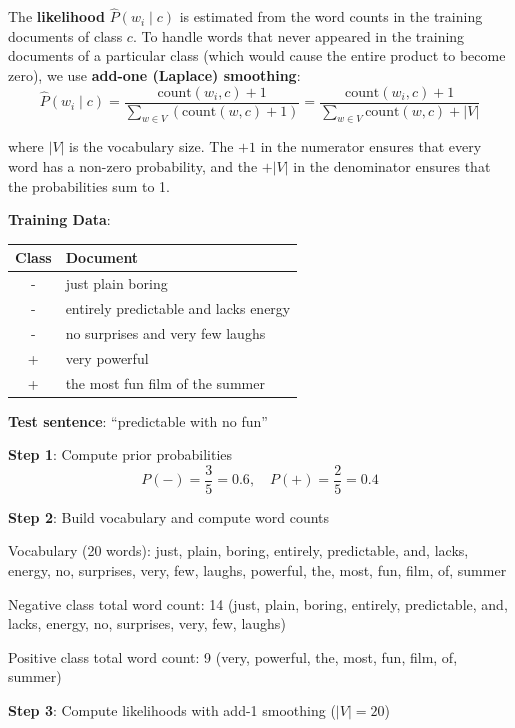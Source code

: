 \documentclass[11pt,a4paper]{article}
\begin{document}
The \textbf{likelihood} $\hat{P}(w_i \mid c)$ is estimated from the word counts in the training documents of class $c$. To handle words that never appeared in the training documents of a particular class (which would cause the entire product to become zero), we use \textbf{add-one (Laplace) smoothing}:
\[
\hat{P}(w_i \mid c) = \frac{\text{count}(w_i, c) + 1}{\sum_{w \in V} (\text{count}(w, c) + 1)} = \frac{\text{count}(w_i, c) + 1}{\sum_{w \in V} \text{count}(w, c) + |V|}
\]

where $|V|$ is the vocabulary size. The $+1$ in the numerator ensures that every word has a non-zero probability, and the $+|V|$ in the denominator ensures that the probabilities sum to 1.

\begin{tcolorbox}[colback=green!5!white,colframe=green!75!black,title=\textbf{Numerical: Naive Bayes Sentiment Classification}]
\textbf{Training Data}:
\begin{center}
\begin{tabular}{|c|l|}
\hline
\textbf{Class} & \textbf{Document} \\ \hline
- & just plain boring \\ \hline
- & entirely predictable and lacks energy \\ \hline
- & no surprises and very few laughs \\ \hline
+ & very powerful \\ \hline
+ & the most fun film of the summer \\ \hline
\end{tabular}
\end{center}

\textbf{Test sentence}: ``predictable with no fun''

\textbf{Step 1}: Compute prior probabilities
\[
P(-) = \frac{3}{5} = 0.6, \quad P(+) = \frac{2}{5} = 0.4
\]

\textbf{Step 2}: Build vocabulary and compute word counts

Vocabulary (20 words): just, plain, boring, entirely, predictable, and, lacks, energy, no, surprises, very, few, laughs, powerful, the, most, fun, film, of, summer

Negative class total word count: 14 (just, plain, boring, entirely, predictable, and, lacks, energy, no, surprises, very, few, laughs)

Positive class total word count: 9 (very, powerful, the, most, fun, film, of, summer)

\textbf{Step 3}: Compute likelihoods with add-1 smoothing ($|V| = 20$)


\end{tcolorbox}
\end{document}
